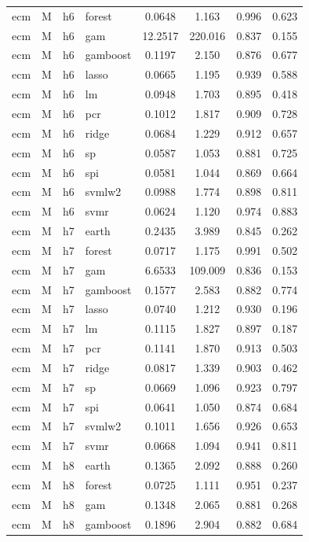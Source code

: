 \begin{ThreePartTable}
\begin{longtable}[t]{llclcccc}
ecm & M & h6 & forest & 0.0648 & 1.163 & 0.996 & 0.623\\
ecm & M & h6 & gam & 12.2517 & 220.016 & 0.837 & 0.155\\
ecm & M & h6 & gamboost & 0.1197 & 2.150 & 0.876 & 0.677\\
ecm & M & h6 & lasso & 0.0665 & 1.195 & 0.939 & 0.588\\
ecm & M & h6 & lm & 0.0948 & 1.703 & 0.895 & 0.418\\
ecm & M & h6 & pcr & 0.1012 & 1.817 & 0.909 & 0.728\\
ecm & M & h6 & ridge & 0.0684 & 1.229 & 0.912 & 0.657\\
ecm & M & h6 & sp & 0.0587 & 1.053 & 0.881 & 0.725\\
ecm & M & h6 & spi & 0.0581 & 1.044 & 0.869 & 0.664\\
ecm & M & h6 & svmlw2 & 0.0988 & 1.774 & 0.898 & 0.811\\
ecm & M & h6 & svmr & 0.0624 & 1.120 & 0.974 & 0.883\\
\addlinespace
ecm & M & h7 & earth & 0.2435 & 3.989 & 0.845 & 0.262\\
ecm & M & h7 & forest & 0.0717 & 1.175 & 0.991 & 0.502\\
ecm & M & h7 & gam & 6.6533 & 109.009 & 0.836 & 0.153\\
ecm & M & h7 & gamboost & 0.1577 & 2.583 & 0.882 & 0.774\\
ecm & M & h7 & lasso & 0.0740 & 1.212 & 0.930 & 0.196\\
ecm & M & h7 & lm & 0.1115 & 1.827 & 0.897 & 0.187\\
ecm & M & h7 & pcr & 0.1141 & 1.870 & 0.913 & 0.503\\
ecm & M & h7 & ridge & 0.0817 & 1.339 & 0.903 & 0.462\\
ecm & M & h7 & sp & 0.0669 & 1.096 & 0.923 & 0.797\\
ecm & M & h7 & spi & 0.0641 & 1.050 & 0.874 & 0.684\\
ecm & M & h7 & svmlw2 & 0.1011 & 1.656 & 0.926 & 0.653\\
ecm & M & h7 & svmr & 0.0668 & 1.094 & 0.941 & 0.811\\
\addlinespace
ecm & M & h8 & earth & 0.1365 & 2.092 & 0.888 & 0.260\\
ecm & M & h8 & forest & 0.0725 & 1.111 & 0.951 & 0.237\\
ecm & M & h8 & gam & 0.1348 & 2.065 & 0.881 & 0.268\\
ecm & M & h8 & gamboost & 0.1896 & 2.904 & 0.882 & 0.684\\

\end{longtable}
\end{ThreePartTable}
